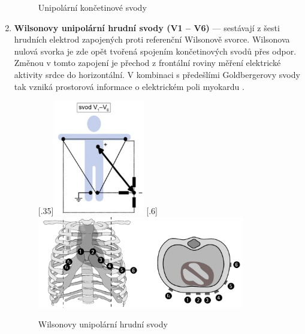 \begin{enumerate}
\begin{figure}[h]
\begin{center}
			      \caption{Unipolární končetinové svody \cite{Kittnar2020}}
			      \label{fig:unipolar1}
		      \end{center}
	      \end{figure}
	\item \textbf{Wilsonovy unipolární hrudní svody (V1 -- V6)} --- sestávají z
	      šesti hrudních elektrod zapojených proti referenční Wilsonově svorce.
	      Wilsonova nulová svorka je zde opět tvořená spojením končetinových
	      svodů přes odpor. Změnou v tomto zapojení je přechod z frontální
	      roviny měření elektrické aktivity srdce do horizontální. V kombinaci s
	      předešlími Goldbergerovy svody tak vzniká prostorová informace o
	      elektrickém poli myokardu \cite{Kittnar2020}.
	      \begin{figure}[h]
		      \centering
		      [.35\linewidth]{\includegraphics[height=5cm]{../assets/anatomy/unipolar2}}
		      \hfill
		      [.6\linewidth]{\includegraphics[height=4cm]{../assets/anatomy/unipolar3}}
		      \caption{Wilsonovy unipolární hrudní svody}
		      \label{fig:wilson}
	      \end{figure}
\end{enumerate}

